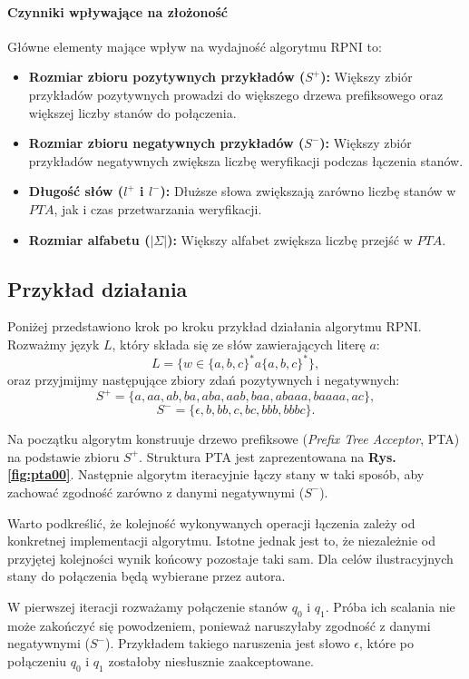 \paragraph*{Czynniki wpływające na złożoność}
Główne elementy mające wpływ na wydajność algorytmu RPNI to:
\begin{itemize}
    \item \textbf{Rozmiar zbioru pozytywnych przykładów (\( S^+ \)):} Większy zbiór przykładów pozytywnych prowadzi do większego drzewa prefiksowego oraz większej liczby stanów do połączenia.
    \item \textbf{Rozmiar zbioru negatywnych przykładów (\( S^- \)):} Większy zbiór przykładów negatywnych zwiększa liczbę weryfikacji podczas łączenia stanów.
    \item \textbf{Długość słów ($l^+$ i $l^-$):} Dłuższe słowa zwiększają zarówno liczbę stanów w \( PTA \), jak i czas przetwarzania weryfikacji.
    \item \textbf{Rozmiar alfabetu (\( |\Sigma| \)):} Większy alfabet zwiększa liczbę przejść w \( PTA \).
\end{itemize}

\subsection{Przykład działania}

Poniżej przedstawiono krok po kroku przykład działania algorytmu RPNI. Rozważmy język $L$, który składa się ze słów zawierających literę $a$: 
\[
L = \{ w \in \{a, b, c\}^*a\{a, b, c\}^* \},
\]
oraz przyjmijmy następujące zbiory zdań pozytywnych i negatywnych:
\[
S^+ = \{ a, aa, ab, ba, aba, aab, baa, abaaa, baaaa, ac \},
\]
\[
S^- = \{ \epsilon, b, bb, c, bc, bbb, bbbc \}.
\]

Na początku algorytm konstruuje drzewo prefiksowe (\textit{Prefix Tree Acceptor}, PTA) na podstawie zbioru \( S^+ \). Struktura PTA jest zaprezentowana na \textbf{Rys. \ref{fig:pta00}}. Następnie algorytm iteracyjnie łączy stany w taki sposób, aby zachować zgodność zarówno z danymi negatywnymi (\( S^- \)). 

Warto podkreślić, że kolejność wykonywanych operacji łączenia zależy od konkretnej implementacji algorytmu. Istotne jednak jest to, że niezależnie od przyjętej kolejności wynik końcowy pozostaje taki sam. Dla celów ilustracyjnych stany do połączenia będą wybierane przez autora.

W pierwszej iteracji rozważamy połączenie stanów \( q_0 \) i \( q_1 \). Próba ich scalania nie może zakończyć się powodzeniem, ponieważ naruszyłaby zgodność z danymi negatywnymi (\( S^- \)). Przykładem takiego naruszenia jest słowo \( \epsilon \), które po połączeniu \( q_0 \) i \( q_1 \) zostałoby niesłusznie zaakceptowane. 


